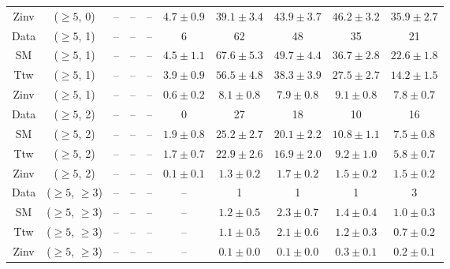 \begin{table}[h!]
{\begin{tabular}{cccccccccc}
	Zinv & ($\ge5$, 0) & -- & -- & -- & $4.7\pm 0.9$ & $39.1\pm 3.4$ & $43.9\pm 3.7$ & $46.2\pm 3.2$ & $35.9\pm 2.7$ \\[0.5ex] 
	Data & ($\ge5$, 1) & -- & -- & -- & 6 & 62 & 48 & 35 & 21 \\[0.5ex] 
	SM & ($\ge5$, 1) & -- & -- & -- & $4.5\pm 1.1$ & $67.6\pm 5.3$ & $49.7\pm 4.4$ & $36.7\pm 2.8$ & $22.6\pm 1.8$ \\[0.5ex] 
	Ttw & ($\ge5$, 1) & -- & -- & -- & $3.9\pm 0.9$ & $56.5\pm 4.8$ & $38.3\pm 3.9$ & $27.5\pm 2.7$ & $14.2\pm 1.5$ \\[0.5ex] 
	Zinv & ($\ge5$, 1) & -- & -- & -- & $0.6\pm 0.2$ & $8.1\pm 0.8$ & $7.9\pm 0.8$ & $9.1\pm 0.8$ & $7.8\pm 0.7$ \\[0.5ex] 
	Data & ($\ge5$, 2) & -- & -- & -- & 0 & 27 & 18 & 10 & 16 \\[0.5ex] 
	SM & ($\ge5$, 2) & -- & -- & -- & $1.9\pm 0.8$ & $25.2\pm 2.7$ & $20.1\pm 2.2$ & $10.8\pm 1.1$ & $7.5\pm 0.8$ \\[0.5ex] 
	Ttw & ($\ge5$, 2) & -- & -- & -- & $1.7\pm 0.7$ & $22.9\pm 2.6$ & $16.9\pm 2.0$ & $9.2\pm 1.0$ & $5.8\pm 0.7$ \\[0.5ex] 
	Zinv & ($\ge5$, 2) & -- & -- & -- & $0.1\pm 0.1$ & $1.3\pm 0.2$ & $1.7\pm 0.2$ & $1.5\pm 0.2$ & $1.5\pm 0.2$ \\[0.5ex] 
	Data & ($\ge5$, $\ge3$) & -- & -- & -- & -- & 1 & 1 & 1 & 3 \\[0.5ex] 
	SM & ($\ge5$, $\ge3$) & -- & -- & -- & -- & $1.2\pm 0.5$ & $2.3\pm 0.7$ & $1.4\pm 0.4$ & $1.0\pm 0.3$ \\[0.5ex] 
	Ttw & ($\ge5$, $\ge3$) & -- & -- & -- & -- & $1.1\pm 0.5$ & $2.1\pm 0.6$ & $1.2\pm 0.3$ & $0.7\pm 0.2$ \\[0.5ex] 
	Zinv & ($\ge5$, $\ge3$) & -- & -- & -- & -- & $0.1\pm 0.0$ & $0.1\pm 0.0$ & $0.3\pm 0.1$ & $0.2\pm 0.1$ \\[0.5ex] 
	\hline
	\hline
\end{tabular}}
\end{table}
